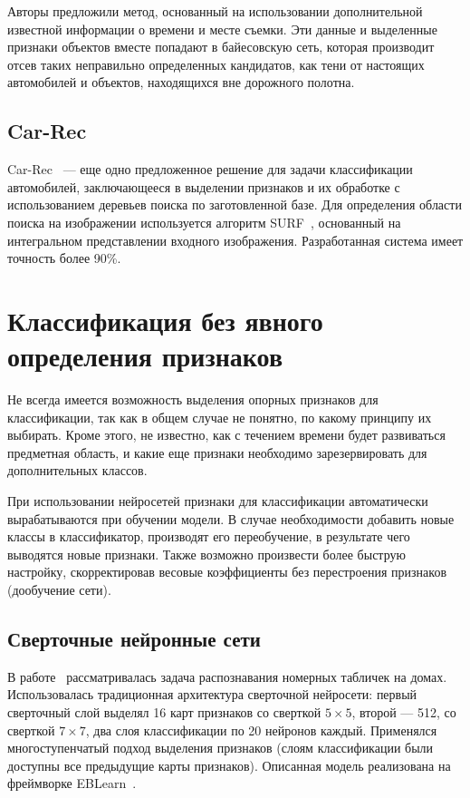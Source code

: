 \documentclass[a4paper,14pt]{extarticle} %
\begin{document}
Авторы предложили метод, основанный на использовании дополнительной известной информации о времени и месте съемки. Эти данные и выделенные признаки объектов вместе попадают в байесовскую сеть, которая производит отсев таких неправильно определенных кандидатов, как тени от настоящих автомобилей и объектов, находящихся вне дорожного полотна. 

\subsection{Car-Rec}
\hspace{\parindent} Car-Rec~\cite{jang2011car} --- еще одно предложенное решение для задачи классификации автомобилей, заключающееся в выделении признаков и их обработке с использованием деревьев поиска по заготовленной базе. Для определения области поиска на изображении используется алгоритм SURF~\cite{bay2008speeded}, основанный на интегральном представлении входного изображения. Разработанная система имеет точность более 90\%.

\section{Классификация без явного определения признаков}
\hspace{\parindent} Не всегда имеется возможность выделения опорных признаков для классификации, так как в общем случае не понятно, по какому принципу их выбирать. Кроме этого, не известно, как с течением времени будет развиваться предметная область, и какие еще признаки необходимо зарезервировать для дополнительных классов. 

При использовании нейросетей признаки для классификации автоматически вырабатываются при обучении модели. В случае необходимости добавить новые классы в классификатор, производят его переобучение, в результате чего выводятся новые признаки. Также возможно произвести более быструю настройку, скорректировав весовые коэффициенты без перестроения признаков (дообучение сети).

\subsection{Сверточные нейронные сети}
\hspace{\parindent} В работе~\cite{sermanet2012convolutional} рассматривалась задача распознавания номерных табличек на домах. Использовалась традиционная архитектура сверточной нейросети: первый сверточный слой выделял 16 карт признаков со сверткой $5 \times 5$, второй --- 512, со сверткой $7 \times 7$, два слоя классификации по 20 нейронов каждый. Применялся многоступенчатый подход выделения признаков (слоям классификации были доступны все предыдущие карты признаков). Описанная модель реализована на фреймворке EBLearn~\cite{sermanet2009eblearn}.
\end{document}
